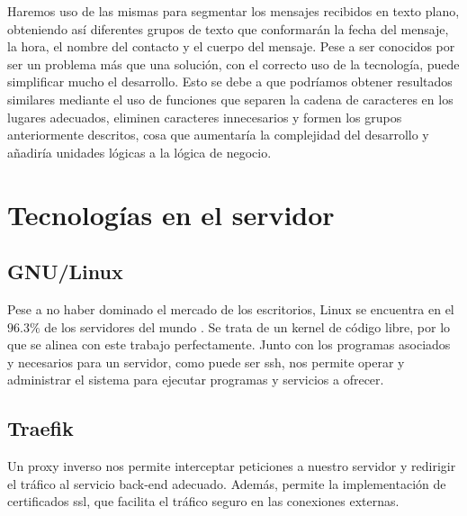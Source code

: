 Haremos uso de las mismas para segmentar los mensajes recibidos en texto plano, obteniendo así diferentes grupos de texto que conformarán la fecha del mensaje, la hora, el nombre del contacto y el cuerpo del mensaje. Pese a ser conocidos por ser un problema más que una solución, con el correcto uso de la tecnología, puede simplificar mucho el desarrollo. Esto se debe a que podríamos obtener resultados similares mediante el uso de funciones que separen la cadena de caracteres en los lugares adecuados, eliminen caracteres innecesarios y formen los grupos anteriormente descritos, cosa que aumentaría la complejidad del desarrollo y añadiría unidades lógicas a la lógica de negocio.


\section{Tecnologías en el servidor}
\label{tec_hab:server}

\begin{comment}
	Debido a la sencillez de nuestra lógica de negocio, no contamos con un back-end en el servidor, dado que únicamente servimos la aplicación al cliente. Una vez servida la aplicación, todas las operaciones se ejecutan en el cliente.
\end{comment}



\subsection{GNU/Linux}
\label{tec_hab:linux}

Pese a no haber dominado el mercado de los escritorios, Linux se encuentra en el $96.3\%$ de los servidores del mundo \cite{linuxMarketShare}. Se trata de un kernel de código libre, por lo que se alinea con este trabajo perfectamente. Junto con los programas asociados y necesarios para un servidor, como puede ser \acrshort{ssh}, nos permite operar y administrar el sistema para ejecutar programas y servicios a ofrecer.


\subsection{Traefik}
\label{tec_hab:traefik}

Un proxy inverso nos permite interceptar peticiones a nuestro servidor y redirigir el tráfico al servicio back-end adecuado. Además, permite la implementación de certificados \acrshort{ssl}, que facilita el tráfico seguro en las conexiones externas.

